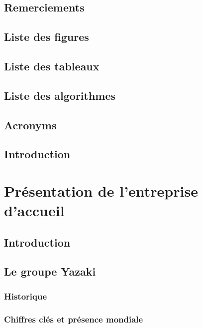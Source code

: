 \documentclass[12pt,a4paper]{report}
\begin{document}
\tableofcontents

\newpage

\section*{Remerciements}

\section*{Liste des figures}

\section*{Liste des tableaux}

\section*{Liste des algorithmes}

\section*{Acronyms}

\section*{Introduction}

\chapter{Présentation de l'entreprise d'accueil}
\section*{Introduction}
\section{Le groupe Yazaki}
\subsection{Historique}
\subsection{Chiffres clés et présence mondiale}
\end{document}
